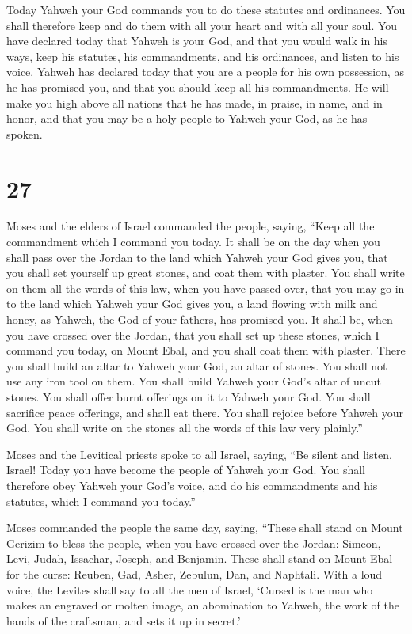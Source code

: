  Today Yahweh your God commands you to do these statutes
and ordinances. You shall therefore keep and do them with all your heart
and with all your soul.  You have declared today that
Yahweh is your God, and that you would walk in his ways, keep his
statutes, his commandments, and his ordinances, and listen to his voice.
 Yahweh has declared today that you are a people for his
own possession, as he has promised you, and that you should keep all his
commandments.  He will make you high above all nations that
he has made, in praise, in name, and in honor, and that you may be a
holy people to Yahweh your God, as he has spoken.

\hypertarget{section-26}{%
\section{27}\label{section-26}}

 Moses and the elders of Israel commanded the people,
saying, ``Keep all the commandment which I command you today.
 It shall be on the day when you shall pass over the Jordan
to the land which Yahweh your God gives you, that you shall set yourself
up great stones, and coat them with plaster.  You shall
write on them all the words of this law, when you have passed over, that
you may go in to the land which Yahweh your God gives you, a land
flowing with milk and honey, as Yahweh, the God of your fathers, has
promised you.  It shall be, when you have crossed over the
Jordan, that you shall set up these stones, which I command you today,
on Mount Ebal, and you shall coat them with plaster.  There
you shall build an altar to Yahweh your God, an altar of stones. You
shall not use any iron tool on them.  You shall build Yahweh
your God's altar of uncut stones. You shall offer burnt offerings on it
to Yahweh your God.  You shall sacrifice peace offerings,
and shall eat there. You shall rejoice before Yahweh your God.
 You shall write on the stones all the words of this law
very plainly.''

 Moses and the Levitical priests spoke to all Israel,
saying, ``Be silent and listen, Israel! Today you have become the people
of Yahweh your God.  You shall therefore obey Yahweh your
God's voice, and do his commandments and his statutes, which I command
you today.''

 Moses commanded the people the same day, saying,
 ``These shall stand on Mount Gerizim to bless the people,
when you have crossed over the Jordan: Simeon, Levi, Judah, Issachar,
Joseph, and Benjamin.  These shall stand on Mount Ebal for
the curse: Reuben, Gad, Asher, Zebulun, Dan, and Naphtali. 
With a loud voice, the Levites shall say to all the men of Israel,
 `Cursed is the man who makes an engraved or molten image,
an abomination to Yahweh, the work of the hands of the craftsman, and
sets it up in secret.'

